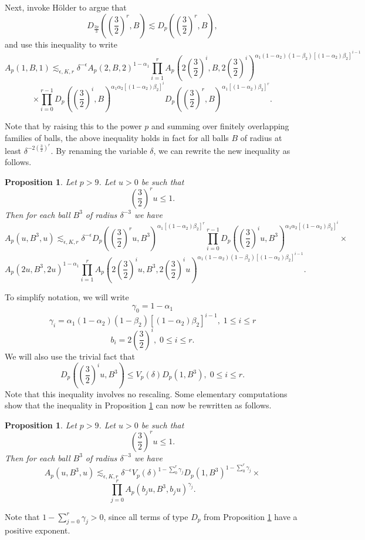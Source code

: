\documentclass[amssymb,amsfonts,12pt]{amsart}
\newtheorem{proposition}[theorem]{Proposition}
\begin{document}
Next, invoke H\"older to argue that
$$D_{\frac{2p}3}((\frac32)^r,B)\lesssim D_{p}((\frac32)^r,B),$$
and use this inequality to write
$$
A_p(1,B,1)\lesssim_{\epsilon,K,r}\delta^{-\epsilon}A_p(2,B,2)^{1-\alpha_1}\prod_{i=1}^rA_p(2(\frac32)^i,B,2(\frac32)^i)^{\alpha_1(1-\alpha_2)(1-\beta_2)[(1-\alpha_2)\beta_2]^{i-1}}$$
$$\times\prod_{i=0}^{r-1}D_p((\frac32)^i,B)^{\alpha_1\alpha_2[(1-\alpha_2)\beta_2]^i}D_{p}((\frac32)^r,B)^{\alpha_1[(1-\alpha_2)\beta_2]^r}
.$$

Note that by raising this to the power $p$ and summing over finitely overlapping families of balls, the above inequality holds in fact for all balls $B$ of radius at least $\delta^{-2(\frac32)^r}$. By renaming the variable $\delta$, we can rewrite the new inequality as follows.
\begin{proposition}
\label{np5}
Let $p>9$.
Let $u>0$ be such that
$$(\frac32)^ru\le 1.$$
Then for each ball $B^3$ of radius $\delta^{-3}$ we have
$$
A_p(u,B^3,u)\lesssim_{\epsilon,K,r}\delta^{-\epsilon}D_{p}((\frac32)^ru,B^3)^{\alpha_1[(1-\alpha_2)\beta_2]^r}\prod_{i=0}^{r-1}D_p((\frac32)^iu,B^3)^{\alpha_1\alpha_2[(1-\alpha_2)\beta_2]^i}\times
$$
$$A_p(2u,B^3,2u)^{1-\alpha_1}\prod_{i=1}^rA_p(2(\frac32)^iu,B^3,2(\frac32)^iu)^{\alpha_1(1-\alpha_2)(1-\beta_2)[(1-\alpha_2)\beta_2]^{i-1}}.$$
\end{proposition}
To simplify notation, we will write
$$\gamma_0=1-\alpha_1$$
$$\gamma_i=\alpha_1(1-\alpha_2)(1-\beta_2)[(1-\alpha_2)\beta_2]^{i-1},\;1\le i\le r$$
$$b_i=2(\frac32)^{i},\;0\le i\le r.$$
We will also use the trivial fact that
\begin{equation}
\label{ne42}
D_p((\frac32)^iu,B^3)\le V_p(\delta)D_p(1,B^3),\;0\le i\le r.
\end{equation}
Note that this inequality involves no rescaling.
Some elementary computations show that the inequality in Proposition \ref{np5} can now be rewritten as follows.
\begin{proposition}
\label{np6}
Let $p>9$.
Let $u>0$ be such that
$$(\frac32)^ru\le 1.$$
Then for each ball $B^3$ of radius $\delta^{-3}$ we have
$$
A_p(u,B^3,u)\lesssim_{\epsilon,K,r}\delta^{-\epsilon}V_p(\delta)^{1-\sum_{0}^r\gamma_j}D_p(1,B^3)^{1-\sum_{0}^r\gamma_j}\times
$$
$$\prod_{j=0}^rA_p(b_ju,B^3,b_ju)^{\gamma_j}.$$
\end{proposition}
Note that $1-\sum_{j=0}^r\gamma_j>0$, since all terms of type $D_p$ from Proposition \ref{np5} have a positive exponent.
\bigskip
\end{document}
